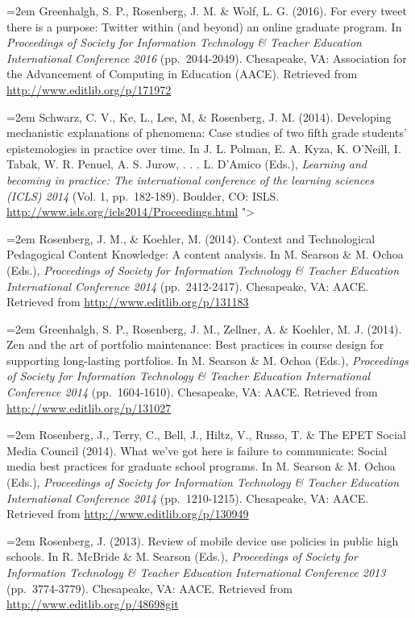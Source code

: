 \documentclass[
  11pt,
]{article}
\begin{document}
\hangindent=2em Greenhalgh, S. P., Rosenberg, J. M. \& Wolf, L. G.
(2016). For every tweet there is a purpose: Twitter within (and beyond)
an online graduate program. In \emph{Proceedings of Society for
Information Technology \& Teacher Education International Conference
2016} (pp.~2044-2049). Chesapeake, VA: Association for the Advancement
of Computing in Education (AACE). Retrieved from
\url{http://www.editlib.org/p/171972}

\hangindent=2em Schwarz, C. V., Ke, L., Lee, M, \& Rosenberg, J. M.
(2014). Developing mechanistic explanations of phenomena: Case studies
of two fifth grade students' epistemologies in practice over time. In J.
L. Polman, E. A. Kyza, K. O'Neill, I. Tabak, W. R. Penuel, A. S. Jurow,
. . . L. D'Amico (Eds.), \emph{Learning and becoming in practice: The
international conference of the learning sciences (ICLS) 2014} (Vol. 1,
pp.~182-189). Boulder, CO: ISLS.
\url{http://www.isls.org/icls2014/Proceedings.html} "\textgreater{}

\hangindent=2em Rosenberg, J. M., \& Koehler, M. (2014). Context and
Technological Pedagogical Content Knowledge: A content analysis. In M.
Searson \& M. Ochoa (Eds.), \emph{Proceedings of Society for Information
Technology \& Teacher Education International Conference 2014}
(pp.~2412-2417). Chesapeake, VA: AACE. Retrieved from
\url{http://www.editlib.org/p/131183}

\hangindent=2em Greenhalgh, S. P., Rosenberg, J. M., Zellner, A. \&
Koehler, M. J. (2014). Zen and the art of portfolio maintenance: Best
practices in course design for supporting long-lasting portfolios. In M.
Searson \& M. Ochoa (Eds.), \emph{Proceedings of Society for Information
Technology \& Teacher Education International Conference 2014}
(pp.~1604-1610). Chesapeake, VA: AACE. Retrieved from
\url{http://www.editlib.org/p/131027}

\hangindent=2em Rosenberg, J., Terry, C., Bell, J., Hiltz, V., Russo, T.
\& The EPET Social Media Council (2014). What we've got here is failure
to communicate: Social media best practices for graduate school
programs. In M. Searson \& M. Ochoa (Eds.), \emph{Proceedings of Society
for Information Technology \& Teacher Education International Conference
2014} (pp.~1210-1215). Chesapeake, VA: AACE. Retrieved from
\url{http://www.editlib.org/p/130949}

\hangindent=2em Rosenberg, J. (2013). Review of mobile device use
policies in public high schools. In R. McBride \& M. Searson (Eds.),
\emph{Proceedings of Society for Information Technology \& Teacher
Education International Conference 2013} (pp.~3774-3779). Chesapeake,
VA: AACE. Retrieved from \url{http://www.editlib.org/p/48698git}
\end{document}
